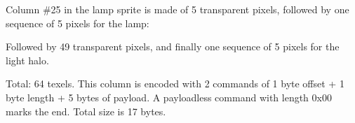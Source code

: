 \begin{minipage}{.5\textwidth}
 Column \#25 in the lamp sprite is made of 5 transparent pixels, followed by one sequence of 5 pixels for the lamp:\\
\par
{}
\par
Followed by 49 transparent pixels, and finally one sequence of 5 pixels for the light halo.\\
\par
{}
\par
Total: 64 texels. This column is encoded with 2 commands of 1 byte offset +  1 byte length + 5 bytes of payload. A payloadless command with length 0x00 marks the end. Total size is 17 bytes.\\
 \end{minipage}
\begin{minipage}{.5\textwidth}
\begin{figure}[H]
  \begin{flushright}
   \end{flushright}
\end{figure}
\end{minipage}



